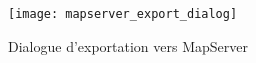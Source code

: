 
\begin{figure}[ht]
\begin{center}
  \caption{Dialogue d'exportation vers MapServer \nixcaption}
  \label{fig:mapserver_export_dialog}\smallskip
  \texttt{[image: mapserver\_export\_dialog]}
\end{center}
\end{figure}


